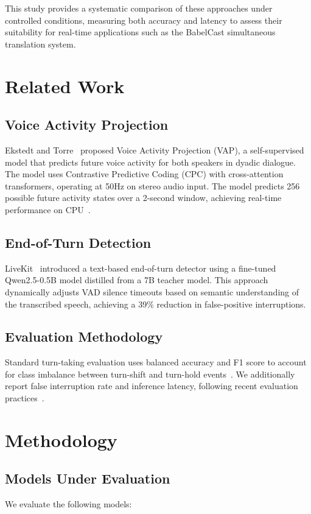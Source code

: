 \documentclass[conference]{IEEEtran}
\begin{document}
This study provides a systematic comparison of these approaches under controlled
conditions, measuring both accuracy and latency to assess their suitability
for real-time applications such as the BabelCast simultaneous translation system.

\section{Related Work}

\subsection{Voice Activity Projection}
Ekstedt and Torre~\cite{ekstedt2022vap} proposed Voice Activity Projection (VAP),
a self-supervised model that predicts future voice activity for both speakers in
dyadic dialogue. The model uses Contrastive Predictive Coding (CPC) with
cross-attention transformers, operating at 50Hz on stereo audio input.
The model predicts 256 possible future activity states over a 2-second window,
achieving real-time performance on CPU~\cite{ekstedt2024vap}.

\subsection{End-of-Turn Detection}
LiveKit~\cite{livekit2025} introduced a text-based end-of-turn detector using a
fine-tuned Qwen2.5-0.5B model distilled from a 7B teacher model. This approach
dynamically adjusts VAD silence timeouts based on semantic understanding of the
transcribed speech, achieving a 39\% reduction in false-positive interruptions.

\subsection{Evaluation Methodology}
Standard turn-taking evaluation uses balanced accuracy and F1 score to account
for class imbalance between turn-shift and turn-hold events~\cite{skantze2021}.
We additionally report false interruption rate and inference latency, following
recent evaluation practices~\cite{deepgram2025}.

\section{Methodology}

\subsection{Models Under Evaluation}
We evaluate the following models:
\end{document}
